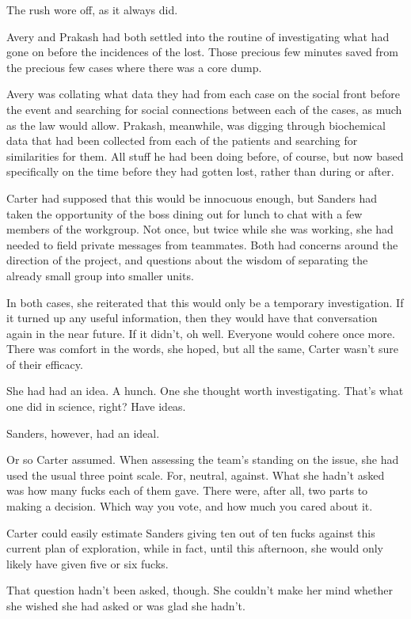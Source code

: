 The rush wore off, as it always did.

Avery and Prakash had both settled into the routine of investigating what had gone on before the incidences of the lost. Those precious few minutes saved from the precious few cases where there was a core dump.

Avery was collating what data they had from each case on the social front before the event and searching for social connections between each of the cases, as much as the law would allow. Prakash, meanwhile, was digging through biochemical data that had been collected from each of the patients and searching for similarities for them. All stuff he had been doing before, of course, but now based specifically on the time before they had gotten lost, rather than during or after.

Carter had supposed that this would be innocuous enough, but Sanders had taken the opportunity of the boss dining out for lunch to chat with a few members of the workgroup. Not once, but twice while she was working, she had needed to field private messages from teammates. Both had concerns around the direction of the project, and questions about the wisdom of separating the already small group into smaller units.

In both cases, she reiterated that this would only be a temporary investigation. If it turned up any useful information, then they would have that conversation again in the near future. If it didn't, oh well. Everyone would cohere once more. There was comfort in the words, she hoped, but all the same, Carter wasn't sure of their efficacy.

She had had an idea. A hunch. One she thought worth investigating. That's what one did in science, right? Have ideas.

Sanders, however, had an ideal.

Or so Carter assumed. When assessing the team's standing on the issue, she had used the usual three point scale. For, neutral, against. What she hadn't asked was how many fucks each of them gave. There were, after all, two parts to making a decision. Which way you vote, and how much you cared about it.

Carter could easily estimate Sanders giving ten out of ten fucks against this current plan of exploration, while in fact, until this afternoon, she would only likely have given five or six fucks.

That question hadn't been asked, though. She couldn't make her mind whether she wished she had asked or was glad she hadn't.

